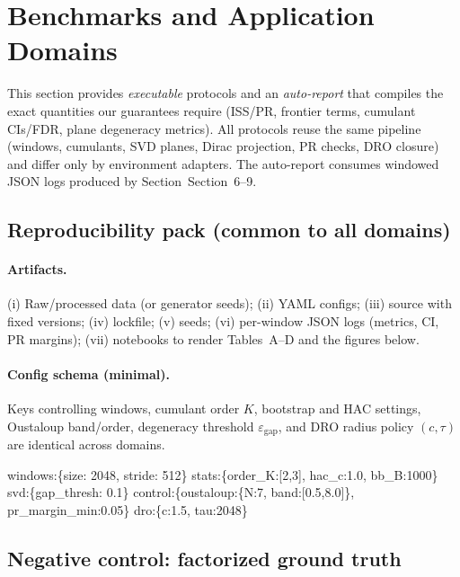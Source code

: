 ﻿\section{Benchmarks and Application Domains}\label{sec:bench1}

This section provides \emph{executable} protocols and an \emph{auto-report} that compiles the exact quantities our guarantees require (ISS/PR, frontier terms, cumulant CIs/FDR, plane degeneracy metrics). All protocols reuse the same pipeline (windows, cumulants, SVD planes, Dirac projection, PR checks, DRO closure) and differ only by environment adapters. The auto-report consumes windowed JSON logs produced by Section~Section~6--9.

\subsection{Reproducibility pack (common to all domains)}\label{subsec:bench-repro}

\paragraph{Artifacts.} (i) Raw/processed data (or generator seeds); (ii) YAML configs; (iii) source with fixed versions; (iv) lockfile; (v) seeds; (vi) per-window JSON logs (metrics, CI, PR margins); (vii) notebooks to render Tables~A--D and the figures below.

\paragraph{Config schema (minimal).} Keys controlling windows, cumulant order $K$, bootstrap and HAC settings, Oustaloup band/order, degeneracy threshold $\varepsilon_{\mathrm{gap}}$, and DRO radius policy $(c,\tau)$ are identical across domains.

\begin{mdframed}\small\ttfamily
windows:\{size: 2048, stride: 512\}\quad
stats:\{order\_K:[2,3], hac\_c:1.0, bb\_B:1000\}\quad
svd:\{gap\_thresh: 0.1\}\quad
control:\{oustaloup:\{N:7, band:[0.5,8.0]\}, pr\_margin\_min:0.05\}\quad
dro:\{c:1.5, tau:2048\}
\end{mdframed}

\subsection{Negative control: factorized ground truth}\label{subsec:neg-control}

